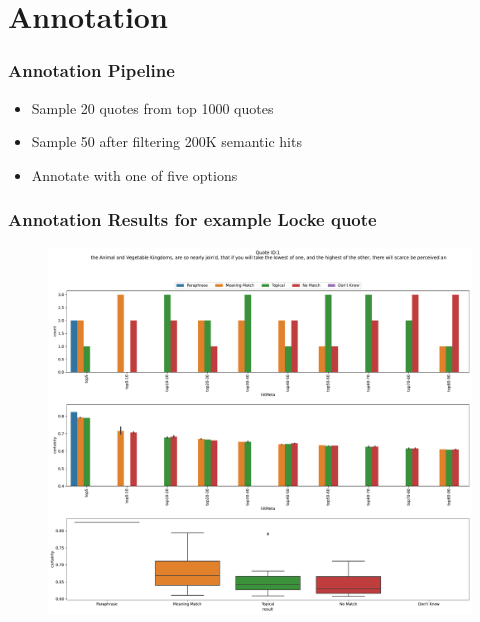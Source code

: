 \documentclass[pdf]{beamer}
\begin{document}
\section{Annotation}

\begin{frame}
  \frametitle{Annotation Pipeline}
  
  \begin{itemize}
    \item<only@2> Sample 20 quotes from top 1000 quotes
    \item<only@3> Sample 50 after filtering 200K semantic hits
    \item<only@4> Annotate with one of five options

  \end{itemize}
\end{frame}

\begin{frame}
  \frametitle{Annotation Results for example Locke quote}
  \begin{figure}
    \centering
    \includegraphics[width=\linewidth,height=\textheight,keepaspectratio,clip,trim={0 8cm 0 0}]{images/quote_1_annotation_results.pdf}
  \end{figure}
\end{frame}
\end{document}
